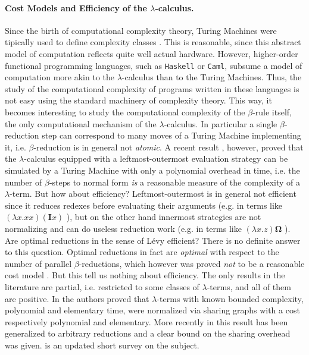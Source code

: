 \documentclass[english]{scrartcl}
\begin{document}
\paragraph{Cost Models and Efficiency of the $\lambda$-calculus.}Since the birth of computational complexity theory, Turing Machines were tipically used to define complexity classes \cite{hartmanis_computational_1965}. This is reasonable, since this abstract model of computation reflects quite well actual hardware. However, higher-order functional programming languages, such as \texttt{Haskell} or \texttt{Caml}, subsume a model of computation more akin to the $\lambda$-calculus than to the Turing Machines. Thus, the study of the computational complexity of programs written in these languages is not easy using the standard machinery of complexity theory. This way, it becomes interesting to study the computational complexity of the $\beta$-rule itself, the only computational mechanism of the $\lambda$-calculus. In particular a single $\beta$-reduction step can correspond to many moves of a Turing Machine implementing it, i.e. $\beta$-reduction is in general not \emph{atomic}. A recent result \cite{accattoli_leftmost-outermost_2016}, however, proved that the $\lambda$-calculus equipped with a leftmost-outermost evaluation strategy can be simulated by a Turing Machine with only a polynomial overhead in time, i.e. the number of $\beta$-steps to normal form \emph{is} a reasonable measure of the complexity of a $\lambda$-term. But how about efficiency? Leftmost-outermost is in general not efficient since it reduces redexes before evaluating their arguments (e.g. in terms like $(\lambda x.xx)(\mathbf{I}x)$ ), but on the other hand innermost strategies are not normalizing and can do useless reduction work (e.g. in terms like $(\lambda x.z)\bm{\Omega}$ ). Are optimal reductions in the sense of Lévy efficient? There is no definite answer to this question. Optimal reductions in fact are \emph{optimal} with respect to the number of parallel $\beta$-reductions, which however was proved \emph{not} to be a reasonable cost model \cite{lawall_optimality_1996, asperti_parallel_2001, asperti_optimal_2004}. But this tell us nothing about efficiency. The only results in the literature are partial, i.e. restricted to some classes of $\lambda$-terms, and all of them are positive. In \cite{baillot_light_2011} the authors proved that $\lambda$-terms with known bounded complexity, polynomial and elementary time, were normalized via sharing graphs with a cost respectively polynomial and elementary. More recently in \cite{guerrini_is_2017} this result has been generalized to arbitrary reductions and a clear bound on the sharing overhead was given. \cite{asperti_about_2017} is an updated short survey on the subject.
\end{document}
